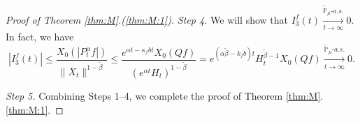\documentclass[EJP]{ejpecp} %
\begin{document}
\begin{proof}[Proof of Theorem \ref{thm:M}.(\ref{thm:M:1})]
	\emph{Step 4.} We will show that $I^f_3(t) \xrightarrow[t\to \infty]{\widetilde {\mathbb P}_\mu \text{-} a.s.} 0$.
	In fact, we have
\begin{equation}
	|I^f_3(t)|
	\leq \frac{X_0(|P^\alpha_tf|)}{\|X_t\|^{1 - \tilde \beta }}
	\leq \frac{e^{\alpha t - \kappa_f b t}X_0(Qf)}{(e^{\alpha t} H_t)^{1 - \tilde \beta}}
	= e^{(\alpha \tilde \beta - k_fb)t} H_t^{\tilde \beta - 1} X_0(Qf)
	\xrightarrow[t\to \infty]{\widetilde {\mathbb P}_\mu \text{-} a.s.} 0.
\end{equation}

	\emph{Step 5.} Combining Steps 1--4, we complete the proof of Theorem  \ref{thm:M}.\eqref{thm:M:1}.
\end{proof}
\end{document}
